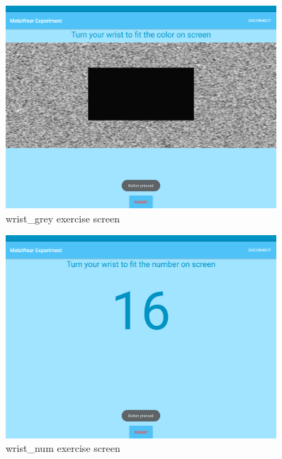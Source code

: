 \begin{figure}[h!]
\centering
\includegraphics[width=0.9\textwidth]{figures/tablet_screen15.png}
\caption{wrist\_grey exercise screen}
\label{appendix_app_screen_15}
\end{figure}

\begin{figure}[h!]
\centering
\includegraphics[width=0.9\textwidth]{figures/tablet_screen16.png}
\caption{wrist\_num exercise screen}
\label{appendix_app_screen_16}
\end{figure}

